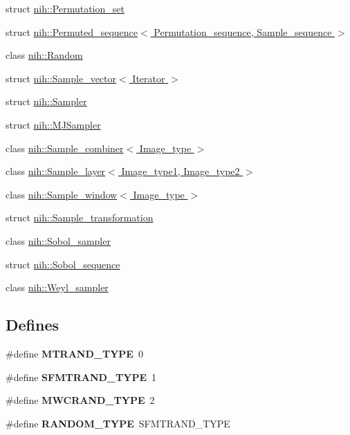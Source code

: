 \begin{DoxyCompactItemize}
struct \hyperlink{structnih_1_1_permutation__set}{nih\-::\-Permutation\-\_\-set}
\item 
struct \hyperlink{structnih_1_1_permuted__sequence}{nih\-::\-Permuted\-\_\-sequence$<$ Permutation\-\_\-sequence, Sample\-\_\-sequence $>$}
\item 
class \hyperlink{classnih_1_1_random}{nih\-::\-Random}
\item 
struct \hyperlink{structnih_1_1_sample__vector}{nih\-::\-Sample\-\_\-vector$<$ Iterator $>$}
\item 
struct \hyperlink{structnih_1_1_sampler}{nih\-::\-Sampler}
\item 
struct \hyperlink{structnih_1_1_m_j_sampler}{nih\-::\-M\-J\-Sampler}
\item 
class \hyperlink{classnih_1_1_sample__combiner}{nih\-::\-Sample\-\_\-combiner$<$ Image\-\_\-type $>$}
\item 
class \hyperlink{classnih_1_1_sample__layer}{nih\-::\-Sample\-\_\-layer$<$ Image\-\_\-type1, Image\-\_\-type2 $>$}
\item 
class \hyperlink{classnih_1_1_sample__window}{nih\-::\-Sample\-\_\-window$<$ Image\-\_\-type $>$}
\item 
struct \hyperlink{structnih_1_1_sample__transformation}{nih\-::\-Sample\-\_\-transformation}
\item 
class \hyperlink{classnih_1_1_sobol__sampler}{nih\-::\-Sobol\-\_\-sampler}
\item 
struct \hyperlink{structnih_1_1_sobol__sequence}{nih\-::\-Sobol\-\_\-sequence}
\item 
class \hyperlink{classnih_1_1_weyl__sampler}{nih\-::\-Weyl\-\_\-sampler}
\end{DoxyCompactItemize}
\subsection*{\-Defines}
\begin{DoxyCompactItemize}
\item 
\hypertarget{group__sampling_ga0602a8d929019640555bc6f299536346}{
\#define {\bfseries \-M\-T\-R\-A\-N\-D\-\_\-\-T\-Y\-P\-E}~0}
\label{group__sampling_ga0602a8d929019640555bc6f299536346}

\item 
\hypertarget{group__sampling_gaba19be52cf7d6a5f72d16f67d09a356a}{
\#define {\bfseries \-S\-F\-M\-T\-R\-A\-N\-D\-\_\-\-T\-Y\-P\-E}~1}
\label{group__sampling_gaba19be52cf7d6a5f72d16f67d09a356a}

\item 
\hypertarget{group__sampling_ga7b5ef73a43bc588bf9f9a163c3bd891e}{
\#define {\bfseries \-M\-W\-C\-R\-A\-N\-D\-\_\-\-T\-Y\-P\-E}~2}
\label{group__sampling_ga7b5ef73a43bc588bf9f9a163c3bd891e}

\item 
\hypertarget{group__sampling_ga925679f23db78f6e2bc1b23186586d1e}{
\#define {\bfseries \-R\-A\-N\-D\-O\-M\-\_\-\-T\-Y\-P\-E}~\-S\-F\-M\-T\-R\-A\-N\-D\-\_\-\-T\-Y\-P\-E}
\label{group__sampling_ga925679f23db78f6e2bc1b23186586d1e}

\end{DoxyCompactItemize}
